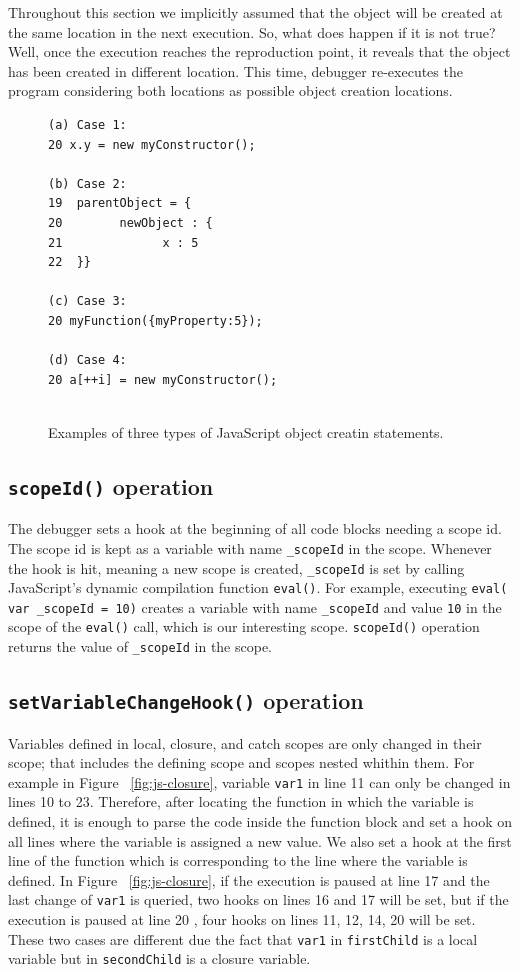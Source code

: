 \documentclass[runningheads,a4paper]{llncs}
\begin{document}
Throughout this section we implicitly assumed that the object will be created at 
the same location in the next execution. So, what does happen if it
is not true? Well, once the execution reaches the reproduction point, it
reveals that the object has been created in different location. This time,
debugger re-executes the program considering both locations as possible 
object creation locations.


\begin{figure}[htp]
\begin{verbatim}
(a) Case 1:
20 x.y = new myConstructor();

(b) Case 2:
19  parentObject = {
20   	  newObject : {
21  			x : 5
22  }}

(c) Case 3:
20 myFunction({myProperty:5});

(d) Case 4:
20 a[++i] = new myConstructor();
 
\end{verbatim}
\caption{Examples of three types of JavaScript object creatin statements.}
\label{fig:objectCreation}
\end{figure}

\subsection{\texttt{scopeId()} operation}
The debugger sets a hook at the beginning of all code blocks needing
a scope id. The scope id is kept as a variable with name 
\texttt{\_scopeId} in the scope. Whenever the hook is hit,  meaning a new scope
is created, \texttt{\_scopeId} is set by calling JavaScript's dynamic compilation 
function \texttt{eval()}. For example, executing \texttt{eval( var \_scopeId = 10)} creates a
variable with name \texttt{\_scopeId} and value \texttt{10} in the
scope of the \texttt{eval()} call, which is our interesting scope. \texttt{scopeId()}
operation returns the value of \texttt{\_scopeId} in the scope.

\subsection{\texttt{setVariableChangeHook()} operation}
Variables defined in local, closure, and catch scopes are only changed in
their scope; that includes the defining scope and scopes nested whithin them.
For example in Figure ~\ref{fig:js-closure}, variable \texttt{var1} in line 11 can only be
changed in lines 10 to 23. Therefore, after locating the function in
which the variable is defined, it is enough to parse the code inside
the function block and set a hook on all lines where the variable is
assigned a new value. 
We also set a hook at the first line of the function which is
corresponding to the line where the variable is defined. In Figure
~\ref{fig:js-closure}, if the execution is paused at line 17 and the
last change of \texttt{var1} is queried, two hooks on lines 16 and 17
will be set, but if the execution is paused at line 20 , four hooks on
lines 11, 12, 14, 20 will be set. These two cases are different due
the fact that \texttt{var1} in \texttt{firstChild} is a local variable
but in \texttt{secondChild} is a closure variable.
\end{document}
